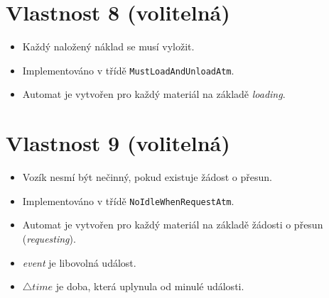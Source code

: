 \documentclass[a4paper, 11pt, fleqn]{scrartcl}
\begin{document}
  \section*{Vlastnost 8 (volitelná)}
    \begin{itemize}[noitemsep]
      \item Každý naložený náklad se musí vyložit.
      \item Implementováno v třídě \texttt{MustLoadAndUnloadAtm}.
      \item Automat je vytvořen pro každý materiál na základě \textit{loading}.
    \end{itemize}

    \begin{figure}[!h]
      \centering
    \end{figure}

    \vspace*{-2em}

  \section*{Vlastnost 9 (volitelná)}
    \begin{itemize}[noitemsep]
      \item Vozík nesmí být nečinný, pokud existuje žádost o přesun.
      \item Implementováno v třídě \texttt{NoIdleWhenRequestAtm}.
      \item Automat je vytvořen pro každý materiál na základě žádosti o přesun (\textit{requesting}).
      \item \textit{event} je libovolná událost.
      \item $\triangle time$ je doba, která uplynula od minulé události.
    \end{itemize}
\end{document}
